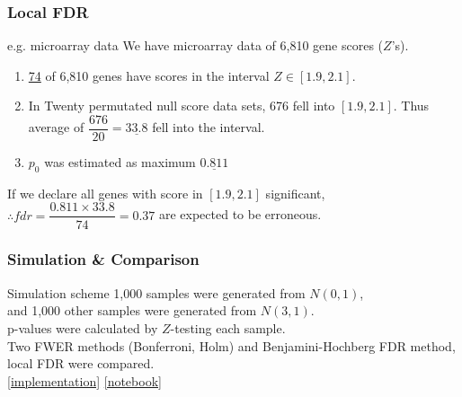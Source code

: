 \documentclass{beamer}
\begin{document}
\frame
{
    \frametitle{Local FDR}
    \begin{block}{e.g. microarray data}
    We have microarray data of 6,810 gene scores ($Z$'s). \vspace{0.15in}\\
    
    \begin{enumerate}[-]
      \item \underline{74} of 6,810 genes have scores in the interval $Z \in [1.9, 2.1]$.\\
      \item In Twenty permutated null score data sets, 676 fell into $[1.9, 2.1]$. Thus average of $\dfrac{676}{20}=\underline{33.8}$ fell into the interval.\\
      \item $p_0$ was estimated as maximum $\underline{0.811}$ \vspace{0.15in}\\
    \end{enumerate}
    
    If we declare all genes with score in $[1.9, 2.1]$ significant, $\therefore fdr=\dfrac{0.811 \times 33.8}{74}=0.37$ are expected to be erroneous.
    
    \end{block}
}


\frame
{
    \frametitle{\LARGE Simulation \& Comparison}
    \normalsize
    \begin{block}{Simulation scheme}
    1,000 samples were generated from $N(0, 1)$, \\and 1,000 other samples were generated from $N(3, 1)$\vspace{0.12in}.\\
    
    p-values were calculated by $Z$-testing each sample. \vspace{0.2in}\\
    
    Two FWER methods (Bonferroni, Holm) and Benjamini-Hochberg FDR method, local FDR were compared.\vspace{0.05in}\\
    \href{https://gist.github.com/naturale0/3915e2def589553e91dce99e69d138cc\#file-mcpconverter-py}{[implementation]} 
     \href{https://gist.github.com/naturale0/3915e2def589553e91dce99e69d138cc\#file-mcp_simulation-ipynb}{[notebook]}
    
    \end{block}
}
\end{document}
